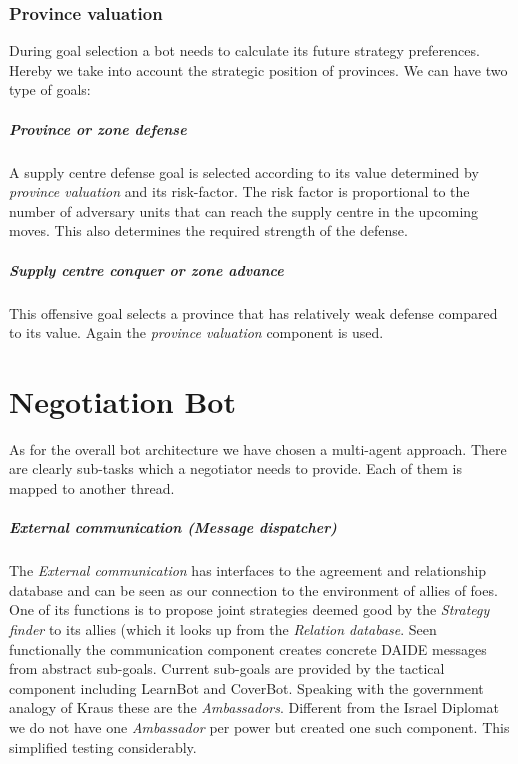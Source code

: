 \documentclass[pdftex,12pt,a4paper]{report}
\begin{document}
\subsection{Province valuation}
During goal selection a bot needs to calculate its future strategy
preferences. Hereby we take into account the strategic position of 
provinces. We can have two type of goals:

\paragraph{Province or zone defense}
A supply centre defense goal is selected according to its value
determined by \textit{province valuation} and its risk-factor. The
risk factor is proportional to the number of adversary units that 
can reach the supply centre in the upcoming moves. This also determines
the required strength of the defense.

\paragraph{Supply centre conquer or zone advance}
This offensive goal selects a province that has relatively weak 
defense compared to its value. Again the \textit{province valuation}
component is used.




\chapter{Negotiation Bot}

As for the overall bot architecture we have chosen a multi-agent 
approach. There are clearly sub-tasks which a negotiator needs to
provide. Each of them is mapped to another thread.

\paragraph{External communication (Message dispatcher)}
The \textit{External communication} has interfaces to the agreement 
and relationship database and can be seen as our connection to the
environment of allies of foes. One of its functions is to propose
joint strategies deemed good by the \textit{Strategy finder} to its
allies (which it looks up from the \textit{Relation database}. Seen
functionally the communication component creates concrete DAIDE
messages from abstract sub-goals. Current sub-goals are provided
by the tactical component including LearnBot and CoverBot. Speaking
with the government analogy of Kraus \cite{Kraus89} these are the
\textit{Ambassadors}. Different from the Israel Diplomat we do not
have one \textit{Ambassador} per power but created one such 
component. This simplified testing considerably. 
\end{document}
